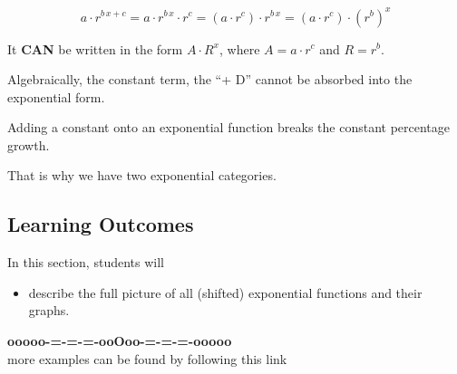 \documentclass{ximera}
\begin{document}
\[
a \cdot r^{b \, x + c} = a \cdot r^{b \, x} \cdot  r^c = (a \cdot r^c) \cdot r^{b \, x} = (a \cdot r^c) \cdot (r^b)^x 
\]

It \textbf{\textcolor{purple!85!blue}{CAN}} be written in the form $A \cdot R^x$, where $A = a \cdot r^c$ and $R = r^b$.


Algebraically, the constant term, the ``+ D'' cannot be absorbed into the exponential form.  

Adding a constant onto an exponential function breaks the constant percentage growth.

That is why we have two exponential categories.





\subsection*{Learning Outcomes}


\begin{sectionOutcomes}
In this section, students will 

\begin{itemize}
\item describe the full picture of all (shifted) exponential functions and their graphs.
\end{itemize}
\end{sectionOutcomes}
















\begin{onlineOnly}
\begin{center}
\textbf{\textcolor{green!50!black}{ooooo-=-=-=-ooOoo-=-=-=-ooooo}} \\

more examples can be found by following this link\\ 

\end{center}
\end{onlineOnly}
\end{document}
